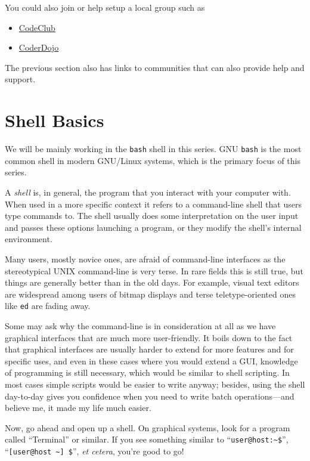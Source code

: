 \documentclass{book}
\begin{document}
You could also join or help setup a local group such as

\begin{itemize}
\item \href{https://www.codeclub.org.uk}{CodeClub}
\item \href{https://coderdojo.com/}{CoderDojo}
\end{itemize}

The previous section also has links to communities that can also provide help and support.


\chapter{Shell Basics}

We will be mainly working in the \texttt{bash} shell in this series. GNU \texttt{bash} is the most common shell in modern GNU/Linux systems, which is the primary focus of this series.

A \textit{shell} is, in general, the program that you interact with your computer with. When used in a more specific context it refers to a command-line shell that users type commands to. The shell usually does some interpretation on the user input and passes these options launching a program, or they modify the shell's internal environment.

Many users, mostly novice ones, are afraid of command-line interfaces as the stereotypical UNIX command-line is very terse. In rare fields this is still true, but things are generally better than in the old days. For example, visual text editors are widespread among users of bitmap displays and terse teletype-oriented ones like \texttt{ed} are fading away.

Some may ask why the command-line is in consideration at all as we have graphical interfaces that are much more user-friendly. It boils down to the fact that graphical interfaces are usually harder to extend for more features and for specific uses, and even in these cases where you would extend a GUI, knowledge of programming is still necessary, which would be similar to shell scripting. In most cases simple scripts would be easier to write anyway; besides, using the shell day-to-day gives you confidence when you need to write batch operations---and believe me, it made my life much easier.

Now, go ahead and open up a shell. On graphical systems, look for a program called ``Terminal'' or similar. If you see something similar to ``\verb|user@host:~$|'', ``\verb|[user@host ~] $|'', \textit{et cetera}, you're good to go!
\end{document}
